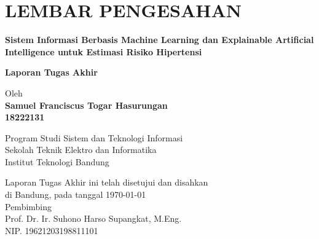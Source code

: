 \chapter*{LEMBAR PENGESAHAN}


\begin{center}
    \vspace{2cm}
  {\large\bfseries Sistem Informasi Berbasis Machine Learning dan Explainable Artificial Intelligence untuk Estimasi Risiko Hipertensi}\\
     \vspace{2cm}

  {\Large \textbf{Laporan Tugas Akhir}}\\


  \vspace{1.5cm}
    
    
  {\large Oleh}\\[0.3cm]
    \textbf{
    {\large Samuel Franciscus Togar Hasurungan}\\
    {\large 18222131}
  }\\
    
  \vspace{0.5cm}
 
  {\large Program Studi Sistem dan Teknologi Informasi}\\
  {\large Sekolah Teknik Elektro dan Informatika}\\
  {\large Institut Teknologi Bandung}\\

  \vspace{1.5cm}

  Laporan Tugas Akhir ini telah disetujui dan disahkan\\ 
  di Bandung, pada tanggal \today\\[1cm]

	Pembimbing  \\[3cm]
	Prof. Dr. Ir. Suhono Harso Supangkat, M.Eng.   \\[0.2cm]
	NIP. 19621203198811101 

\end{center}

\vspace{1cm}
\noindent




